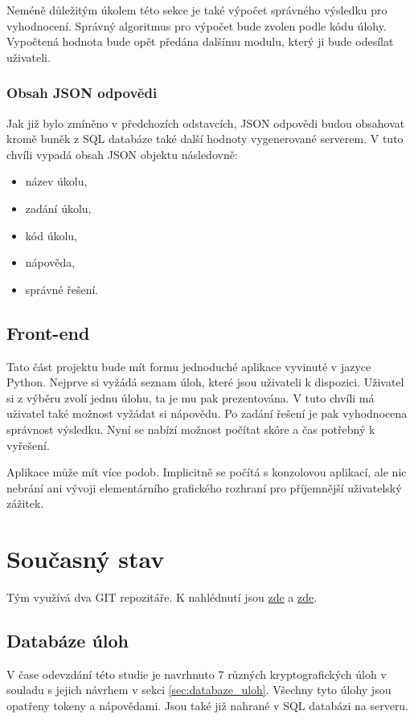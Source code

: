 \documentclass[titlepage]{article}
\begin{document}
Neméně důležitým úkolem této sekce je také výpočet správného výsledku pro vyhodnocení. Správný algoritmus pro výpočet bude zvolen podle kódu úlohy. Vypočtená hodnota bude opět předána dalšímu modulu, který ji bude odesílat uživateli. 

\subsubsection{Obsah JSON odpovědi}\label{sec:obsa_json}
Jak již bylo zmíněno v předchozích odstavcích, JSON odpovědi budou obsahovat kromě buněk z SQL databáze také další hodnoty vygenerované serverem. V tuto chvíli vypadá obsah JSON objektu následovně:
\begin{itemize}
    \item název úkolu,
    \item zadání úkolu,
    \item kód úkolu,
    \item nápověda,
    \item správné řešení.
\end{itemize}


\subsection{Front-end}
Tato část projektu bude mít formu jednoduché aplikace vyvinuté v jazyce Python. Nejprve si vyžádá seznam úloh, které jsou uživateli k dispozici. Uživatel si z výběru zvolí jednu úlohu, ta je mu pak prezentována. V tuto chvíli má uživatel také možnost vyžádat si nápovědu. Po zadání řešení je pak vyhodnocena správnost výsledku. Nyní se nabízí možnost počítat skóre a čas potřebný k vyřešení. 

Aplikace může mít více podob. Implicitně se počítá s konzolovou aplikací, ale nic nebrání ani vývoji elementárního grafického rozhraní pro příjemnější uživatelský zážitek. 



\section{Současný stav}
Tým využívá dva GIT repozitáře. K nahlédnutí jsou \href{https://github.com/voytex/kry_gen}{zde} a \href{https://github.com/voytex/kry_gen-backend}{zde}.
\subsection{Databáze úloh}
V čase odevzdání této studie je navrhnuto 7 různých kryptografických úloh v souladu s jejich návrhem v sekci \ref{sec:databaze_uloh}. Všechny tyto úlohy jsou opatřeny tokeny  a nápovědami. Jsou také již nahrané v SQL databázi na serveru. 
\end{document}
